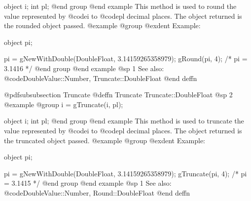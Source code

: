 object  i;
int     pl;
@end group
@end example
This method is used to round the value represented by @code{i} to
@code{pl} decimal places.  The object returned is the rounded
object passed.
@example
@group
@exdent Example:

object  pi;

pi = gNewWithDouble(DoubleFloat, 3.14159265358979);
gRound(pi, 4);     /*  pi = 3.1416  */
@end group
@end example
@sp 1
See also:  @code{DoubleValue::Number, Truncate::DoubleFloat}
@end deffn







 
@pdfsubsubsection {Truncate}
@deffn {Truncate} Truncate::DoubleFloat
@sp 2
@example
@group
i = gTruncate(i, pl);

object  i;
int     pl;
@end group
@end example
This method is used to truncate the value represented by @code{i} to
@code{pl} decimal places.  The object returned is the truncated
object passed.
@example
@group
@exdent Example:

object  pi;

pi = gNewWithDouble(DoubleFloat, 3.14159265358979);
gTruncate(pi, 4);     /*  pi = 3.1415  */
@end group
@end example
@sp 1
See also:  @code{DoubleValue::Number, Round::DoubleFloat}
@end deffn













